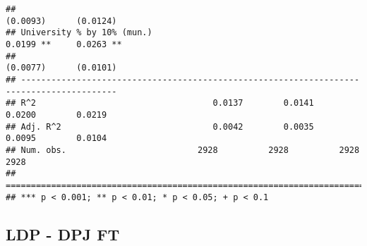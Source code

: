 \documentclass[
]{article}
\begin{document}
\begin{verbatim}
##                                                                  (0.0093)      (0.0124)  
## University % by 10% (mun.)                                        0.0199 **     0.0263 **
##                                                                  (0.0077)      (0.0101)  
## -----------------------------------------------------------------------------------------
## R^2                                   0.0137        0.0141        0.0200        0.0219   
## Adj. R^2                              0.0042        0.0035        0.0095        0.0104   
## Num. obs.                          2928          2928          2928          2928        
## =========================================================================================
## *** p < 0.001; ** p < 0.01; * p < 0.05; + p < 0.1
\end{verbatim}

\hypertarget{ldp---dpj-ft-3}{%
\subsection{LDP - DPJ FT}\label{ldp---dpj-ft-3}}
\end{document}

